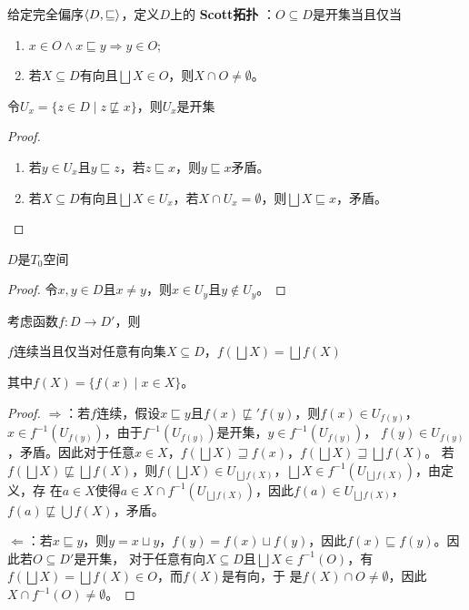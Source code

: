 \documentclass[11pt]{article}
\begin{document}
\begin{definition}[]
给定完全偏序\(\langle D,\sqsubseteq\rangle\)，定义\(D\)上的 \textbf{Scott拓扑} ：\(O\subseteq D\)是开集当且仅当
\begin{enumerate}
\item \(x\in O\wedge x\sqsubseteq y\Rightarrow y\in O\);
\item 若\(X\subseteq D\)有向且\(\bigsqcup X\in O\)，则\(X\cap O\neq\emptyset\)。
\end{enumerate}
\end{definition}

\begin{lemma}[]
令\(U_x=\{z\in D\mid z\not\sqsubseteq x\}\)，则\(U_x\)是开集
\end{lemma}

\begin{proof}
\begin{enumerate}
\item 若\(y\in U_x\)且\(y\sqsubseteq z\)，若\(z\sqsubseteq x\)，则\(y\sqsubseteq x\)矛盾。
\item 若\(X\subseteq D\)有向且\(\bigsqcup X\in U_x\)，若\(X\cap U_x=\emptyset\)，则\(\bigsqcup X\sqsubseteq x\)，矛盾。
\end{enumerate}
\end{proof}

\begin{corollary}[]
\(D\)是\(T_0\)空间
\end{corollary}

\begin{proof}
令\(x,y\in D\)且\(x\neq y\)，则\(x\in U_y\)且\(y\notin U_y\)。
\end{proof}

\begin{proposition}[]
考虑函数\(f:D\to D'\)，则
\begin{center}
\(f\)连续当且仅当对任意有向集\(X\subseteq D\)，\(f(\bigsqcup X)=\bigsqcup f(X)\)
\end{center}
其中\(f(X)=\{f(x)\mid x\in X\}\)。
\end{proposition}

\begin{proof}
\(\Rightarrow\)：若\(f\)连续，假设\(x\sqsubseteq y\)且\(f(x)\not\sqsubseteq' f(y)\)，则\(f(x)\in U_{f(y)}\)，
\(x\in f^{-1}(U_{f(y)})\)，由于\(f^{-1}(U_{f(y)})\)是开集，\(y\in f^{-1}(U_{f(y)})\)，
\(f(y)\in U_{f(y)}\)，矛盾。因此对于任意\(x\in X\)，\(f(\bigsqcup X)\sqsupseteq f(x)\)，\(f(\bigsqcup X)\sqsupseteq\bigsqcup f(X)\)。
若\(f(\bigsqcup X)\not\sqsubseteq\bigsqcup f(X)\)，则\(f(\bigsqcup X)\in U_{\bigsqcup f(X)}\)，\(\bigsqcup X\in f^{-1}(U_{\bigsqcup f(X)})\)，由定义，存
在\(a\in X\)使得\(a\in X\cap f^{-1}(U_{\bigsqcup f(X)})\)，因此\(f(a)\in U_{\bigsqcup f(X)}\)，\(f(a)\not\sqsubseteq\bigcup f(X)\)，矛盾。

\(\Leftarrow\)：若\(x\sqsubseteq y\)，则\(y=x\sqcup y\)，\(f(y)=f(x)\sqcup f(y)\)，因此\(f(x)\sqsubseteq f(y)\)。因此若\(O\subseteq D'\)是开集，
对于任意有向\(X\subseteq D\)且\(\bigsqcup X\in f^{-1}(O)\)，有\(f(\bigsqcup X)=\bigsqcup f(X)\in O\)，而\(f(X)\)是有向，于
是\(f(X)\cap O\neq\emptyset\)，因此\(X\cap f^{-1}(O)\neq\emptyset\)。
\end{proof}
\end{document}
